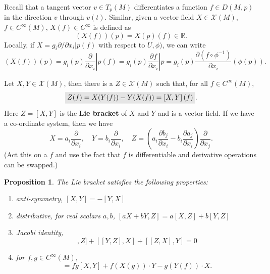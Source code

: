 \documentclass[letter-paper]{tufte-book}
\newtheorem{proposition}[theorem]{\color{pastel-blue}Proposition}
\newcommand{\highlight}[1]{\mathchoice%
  {\colorbox{black!10}{$\displaystyle#1$}}%
  {\colorbox{black!10}{$\textstyle#1$}}%
  {\colorbox{black!10}{$\scriptstyle#1$}}%
  {\colorbox{black!10}{$\scriptscriptstyle#1$}}}%
\begin{document}
Recall that a tangent vector $v\in T_p(M)$ differentiates a function $f \in D(M, p)$ in the direction $v$ through $v(t)$. Similar, given a vector field $X \in \mathcal{X}(M)$, $f\in C^\infty(M)$, $X(f) \in C^\infty$ is defined as
\begin{equation}
  \left(X(f)\right)(p) = X(p)(f) \in \mathbb{R}.
\end{equation}
Locally, if $X = g_i \partial / \partial x_i|p (f)$ with respect to $U, \phi)$, we can write
\begin{equation}
  \left(X(f)\right)(p) = g_i(p) \left.\frac{\partial}{\partial x_i}\right|p (f) = g_i(p) \left.\frac{\partial f}{\partial x_i}\right|p = g_i(p) \frac{\partial (f\circ \phi^{-1})}{\partial x_i}(\phi(p)).
\end{equation}

Let $X, Y \in \mathcal{X}(M)$, then there is a $Z \in \mathcal{X}(M)$ such that, for all $f \in C^\infty(M)$,
\begin{equation}
  \highlight{Z(f) = X(Y(f)) - Y(X(f)) = \left[X, Y\right](f)}.
\end{equation}
Here $Z = [X, Y]$ is the \textbf{Lie bracket} of $X$ and $Y$ and is a vector field. If we have a co-ordinate system, then we have
\begin{equation*}
  X = a_i \frac{\partial}{\partial x_i}, \quad Y = b_i \frac{\partial}{\partial x_i}, \quad Z = \left(a_i \frac{\partial b_j}{\partial x_i} - b_i \frac{\partial a_j}{\partial x_i}\right)\frac{\partial}{\partial x_j}.
\end{equation*}
(Act this on a $f$ and use the fact that $f$ is differentiable and derivative operations can be swapped.)

\begin{proposition}
  The Lie bracket satisfies the following properties:
  \begin{enumerate}
    \item anti-symmetry, $[X,Y] = -[Y, X]$
    \item distributive, for real scalars $a,b$, $[aX + bY, Z] = a[X,Z] + b[Y, Z]$
    \item Jacobi identity,
      \begin{equation*}
        [[X,Y], Z] + [[Y, Z], X] + [[Z, X], Y] = 0
      \end{equation*}
    \item for $f,g\in C^\infty(M)$,
      \begin{equation*}
        [fX + gY] = fg [X, Y] + f(X(g))\cdot Y - g(Y(f))\cdot X.
      \end{equation*}
  \end{enumerate}
\end{proposition}
\end{document}
